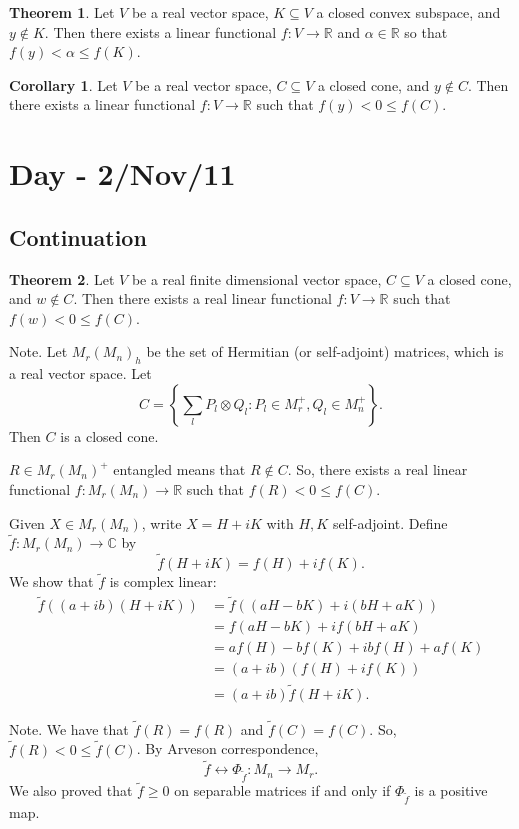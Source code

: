 \documentclass[12pt]{article}
\theoremstyle{definition}
\newtheorem*{theorem}{Theorem}
\newtheorem*{corollary}{Corollary}
\newcommand{\C}{\mathbb{C}}
\newcommand{\R}{\mathbb{R}}
\begin{document}
\begin{theorem}
Let $V$ be a real vector space, $K \subseteq V$ a closed convex subspace, and $y \notin K$. Then there exists a linear functional $f:V \to \R$ and $\alpha \in \R$ so that $f(y)<\alpha \leq f(K)$.
\end{theorem}

\begin{corollary}
Let $V$ be a real vector space, $C \subseteq V$ a closed cone, and $y \notin C$. Then there exists a linear functional $f:V \to \R$ such that $f(y)<0 \leq f(C)$.
\end{corollary}

\section{Day - 2/Nov/11}

\subsection{Continuation}

\begin{theorem}
Let $V$ be a real finite dimensional vector space, $C \subseteq V$ a closed cone, and $w \notin C$. Then there exists a real linear functional $f:V \to \R$ such that $f(w)<0 \leq f(C)$.
\end{theorem}

Note. Let $M_r(M_n)_h$ be the set of Hermitian (or self-adjoint) matrices, which is a real vector space. Let
\[
C=\left\{\sum_l P_l \otimes Q_l : P_l \in M_r^+, Q_l \in M_n^+\right\}.
\]
Then $C$ is a closed cone.

$R \in M_r(M_n)^+$ entangled means that $R \notin C$. So, there exists a real linear functional $f:M_r(M_n) \to \R$ such that $f(R)<0 \leq f(C)$.

Given $X \in M_r(M_n)$, write $X=H+iK$ with $H,K$ self-adjoint. Define $\widetilde{f}:M_r(M_n) \to \C$ by
\[
\widetilde{f}(H+iK)=f(H)+if(K).
\]
We show that $\widetilde{f}$ is complex linear:
\begin{align*}
\widetilde{f}((a+ib)(H+iK)) &= \widetilde{f}((aH-bK)+i(bH+aK)) \\
&= f(aH-bK)+if(bH+aK) \\
&= af(H)-bf(K)+ibf(H)+af(K) \\
&= (a+ib)(f(H)+if(K)) \\
&= (a+ib)\widetilde{f}(H+iK).
\end{align*}

Note. We have that $\widetilde{f}(R)=f(R)$ and $\widetilde{f}(C)=f(C)$. So, $\widetilde{f}(R)<0 \leq \widetilde{f}(C)$. By Arveson correspondence,
\[
\widetilde{f} \leftrightarrow \Phi_{\widetilde{f}}:M_n \to M_r.
\]
We also proved that $\widetilde{f} \geq 0$ on separable matrices if and only if $\Phi_{\widetilde{f}}$ is a positive map.
\end{document}
